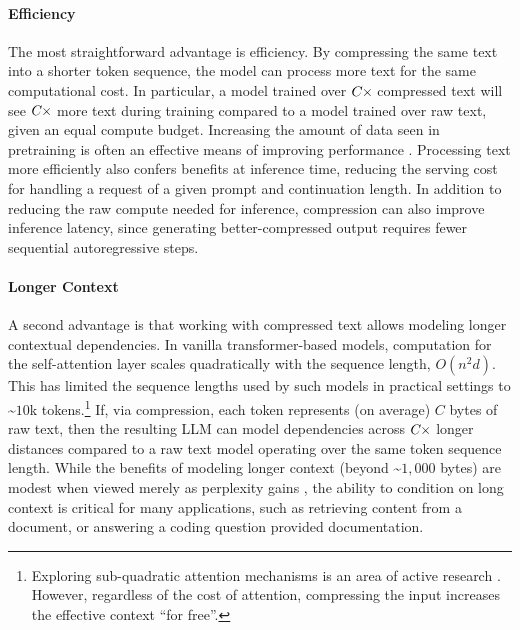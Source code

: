 \paragraph{Efficiency} The most straightforward advantage is efficiency. By compressing the same text into a shorter token sequence, the model can process more text for the same computational cost. In particular, a model trained over $C{\mkern-1mu\times\mkern-1mu}$ compressed text will see $C{\mkern-1mu\times\mkern-1mu}$ more text during training compared to a model trained over raw text, given an equal compute budget. Increasing the amount of data seen in pretraining is often an effective means of improving performance \cite{kaplanScalingLawsNeural2020,hoffmann2022training}. Processing text more efficiently also confers benefits at inference time, reducing the serving cost for handling a request of a given prompt and continuation length. In addition to reducing the raw compute needed for inference, compression can also improve inference latency, since generating better-compressed output requires fewer sequential autoregressive steps.

\paragraph{Longer Context} A second advantage is that working with compressed text allows modeling longer contextual dependencies. In vanilla transformer-based models, computation for the self-attention layer scales quadratically with the sequence length, $O(n^2d)$. This has limited the sequence lengths used by such models in practical settings to \textasciitilde{}$10$k tokens.\footnote{Exploring sub-quadratic attention mechanisms is an area of active research \cite[][\textit{et alia}]{ainslie-etal-2020-etc,wang2020linformer,kitaev2020reformer,zaheer2020bigbird,beltagyLongformerLongDocumentTransformer2020,childGeneratingLongSequences2019}. However, regardless of the cost of attention, compressing the input increases the effective context ``for free''.} If, via compression, each token represents (on average) $C$ bytes of raw text, then the resulting LLM can model dependencies across $C{\mkern-1mu\times\mkern-1mu}$ longer distances compared to a raw text model operating over the same token sequence length. While the benefits of modeling longer context (beyond \textasciitilde{}$1{,}000$ bytes) are modest when viewed merely as perplexity gains \cite{press2022train}, the ability to condition on long context is critical for many applications, such as retrieving content from a document, or answering a coding question provided documentation.

